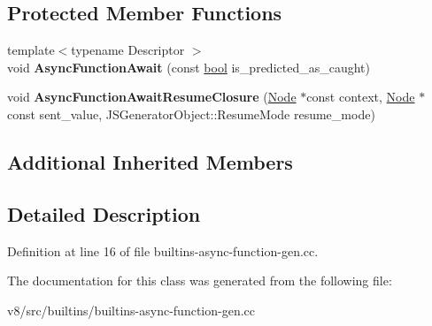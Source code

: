 \subsection*{Protected Member Functions}
\begin{DoxyCompactItemize}
\item 
\mbox{\label{classv8_1_1internal_1_1AsyncFunctionBuiltinsAssembler_ac0e9da8084b4dfaa92ff410fda1729cb}} 
{\footnotesize template$<$typename Descriptor $>$ }\\void {\bfseries Async\+Function\+Await} (const \mbox{\hyperlink{classbool}{bool}} is\+\_\+predicted\+\_\+as\+\_\+caught)
\item 
\mbox{\label{classv8_1_1internal_1_1AsyncFunctionBuiltinsAssembler_a44cc81d12d1af0e39712a85a598a8647}} 
void {\bfseries Async\+Function\+Await\+Resume\+Closure} (\mbox{\hyperlink{classv8_1_1internal_1_1compiler_1_1Node}{Node}} $\ast$const context, \mbox{\hyperlink{classv8_1_1internal_1_1compiler_1_1Node}{Node}} $\ast$const sent\+\_\+value, J\+S\+Generator\+Object\+::\+Resume\+Mode resume\+\_\+mode)
\end{DoxyCompactItemize}
\subsection*{Additional Inherited Members}


\subsection{Detailed Description}


Definition at line 16 of file builtins-\/async-\/function-\/gen.\+cc.



The documentation for this class was generated from the following file\+:\begin{DoxyCompactItemize}
\item 
v8/src/builtins/builtins-\/async-\/function-\/gen.\+cc\end{DoxyCompactItemize}
